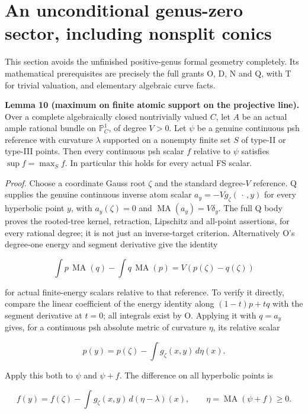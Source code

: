 \documentclass[
  11pt,
]{article}
\begin{document}
\section{An unconditional genus-zero sector, including nonsplit
conics}\label{an-unconditional-genus-zero-sector-including-nonsplit-conics}

This section avoids the unfinished positive-genus formal geometry
completely. Its mathematical prerequisites are precisely the full grants
O, D, N and Q, with T for trivial valuation, and elementary algebraic
curve facts.

\textbf{Lemma 10 (maximum on finite atomic support on the projective
line).} Over a complete algebraically closed nontrivially valued \(C\),
let \(A\) be an actual ample rational bundle on \(\mathbb P^1_C\), of
degree \(V>0\). Let \(\psi\) be a genuine continuous psh reference with
curvature \(\lambda\) supported on a nonempty finite set \(S\) of
type-II or type-III points. Then every continuous psh scalar \(f\)
relative to \(\psi\) satisfies \(\sup f=\max_S f\). In particular this
holds for every actual FS scalar.

\emph{Proof.} Choose a coordinate Gauss root \(\zeta\) and the standard
degree-\(V\) reference. Q supplies the genuine continuous inverse atom
scalar \(a_y=-Vg_\zeta(\,\cdot\,,y)\) for every hyperbolic point \(y\),
with \(a_y(\zeta)=0\) and \(\operatorname{MA}(a_y)=V\delta_y\). The full
Q body proves the rooted-tree kernel, retraction, Lipschitz and
all-point assertions, for every rational degree; it is not just an
inverse-target criterion. Alternatively O's degree-one energy and
segment derivative give the identity

\[
 \int p\,\operatorname{MA}(q)-\int q\,\operatorname{MA}(p)
       =V(p(\zeta)-q(\zeta))
\]

for actual finite-energy scalars relative to that reference. To verify
it directly, compare the linear coefficient of the energy identity along
\((1-t)p+tq\) with the segment derivative at \(t=0\); all integrals
exist by O. Applying it with \(q=a_y\) gives, for a continuous psh
absolute metric of curvature \(\eta\), its relative scalar

\[
 p(y)=p(\zeta)-\int g_\zeta(x,y)\,d\eta(x).
\]

Apply this both to \(\psi\) and \(\psi+f\). The difference on all
hyperbolic points is

\[
 f(y)=f(\zeta)-\int g_\zeta(x,y)\,d(\eta-\lambda)(x),
 \qquad\eta=\operatorname{MA}(\psi+f)\geq0.
\]
\end{document}
